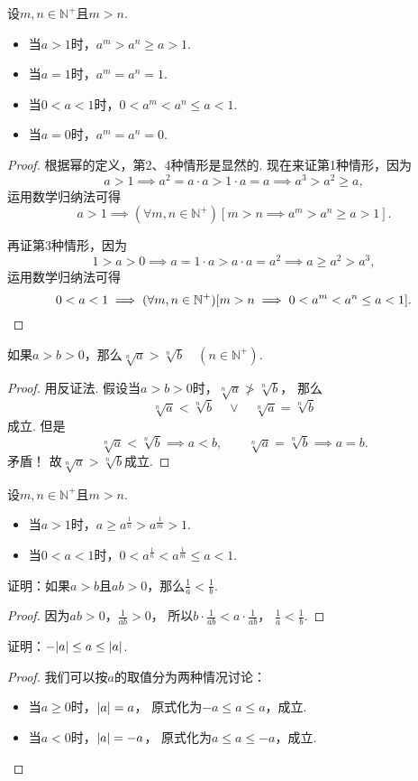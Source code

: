 \begin{corollary}\label{theorem:不等式.正整数次幂的序}
设\(m,n\in\mathbb{N}^+\)且\(m>n\).
\begin{itemize}
	\item 当\(a>1\)时，\(a^m > a^n \geq a > 1\).
	\item 当\(a=1\)时，\(a^m = a^n = 1\).
	\item 当\(0<a<1\)时，\(0 < a^m < a^n \leq a < 1\).
	\item 当\(a=0\)时，\(a^m = a^n = 0\).
\end{itemize}
\begin{proof}
根据幂的定义，第2、4种情形是显然的.
现在来证第1种情形，因为\[
	a > 1
	\implies
	a^2 = a \cdot a > 1 \cdot a = a
	\implies
	a^3 > a^2 \geq a,
\]
运用数学归纳法可得\[
	a>1
	\implies
	(\forall m,n\in\mathbb{N}^+)
	[m>n \implies a^m > a^n \geq a > 1].
\]

再证第3种情形，因为\[
	1>a>0
	\implies
	a = 1 \cdot a > a \cdot a = a^2
	\implies
	a \geq a^2 > a^3,
\]
运用数学归纳法可得\[
	0<a<1
	\implies
	(\forall m,n\in\mathbb{N}^+)
	[m>n \implies 0 < a^m < a^n \leq a < 1].
	\qedhere
\]
\end{proof}
\end{corollary}

\begin{theorem}
如果\(a>b>0\)，那么\(\sqrt[n]{a} > \sqrt[n]{b} \quad (n\in\mathbb{N}^+)\).
\begin{proof}
用反证法.
假设当\(a>b>0\)时，\(\sqrt[n]{a} \ngtr \sqrt[n]{b}\)，
那么\[
	\sqrt[n]{a} < \sqrt[n]{b}
	\quad\lor\quad
	\sqrt[n]{a} = \sqrt[n]{b}
\]成立.
但是\[
	\sqrt[n]{a} < \sqrt[n]{b} \implies a<b,
	\qquad
	\sqrt[n]{a} = \sqrt[n]{b} \implies a=b.
\]矛盾！
故\(\sqrt[n]{a}>\sqrt[n]{b}\)成立.
\end{proof}
\end{theorem}

\begin{theorem}
设\(m,n\in\mathbb{N}^+\)且\(m>n\).
\begin{itemize}
	\item 当\(a>1\)时，\(a \geq a^{\frac1n} > a^{\frac1m} > 1\).
	\item 当\(0<a<1\)时，\(0 < a^{\frac1n} < a^{\frac1m} \leq a < 1\).
\end{itemize}
\end{theorem}

\begin{example}
证明：如果\(a > b\)且\(ab > 0\)，那么\(\frac{1}{a} < \frac{1}{b}\).
\begin{proof}
因为\(ab > 0\)，\(\frac{1}{ab} > 0\)，
所以\(b \cdot \frac{1}{ab} < a \cdot \frac{1}{ab}\)，
\(\frac{1}{a} < \frac{1}{b}\).
\end{proof}
\end{example}

\begin{example}
证明：\(-\abs{a} \leq a \leq \abs{a}\).
\begin{proof}
我们可以按\(a\)的取值分为两种情况讨论：
\begin{itemize}
	\item 当\(a \geq 0\)时，\(\abs{a}=a\)，
	原式化为\(-a \leq a \leq a\)，成立.
	\item 当\(a < 0\)时，\(\abs{a}=-a\)，
	原式化为\(a \leq a \leq -a\)，成立.
	\qedhere
\end{itemize}
\end{proof}
\end{example}
